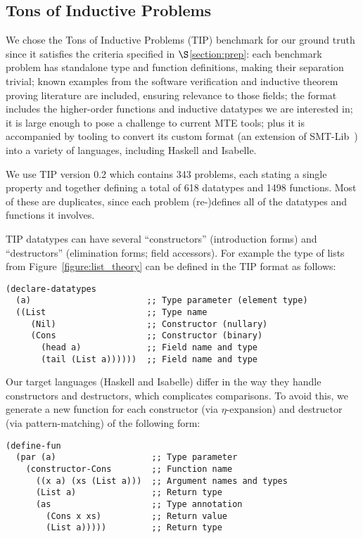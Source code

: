 \subsection{Tons of Inductive Problems}
\label{sec:tip}

We chose the Tons of Inductive Problems (TIP) benchmark for our ground truth
since it satisfies the criteria specified in $\S$\ref{section:prep}: each
benchmark problem has standalone type and function definitions, making their
separation trivial; known examples from the software verification and inductive
theorem proving literature are included, ensuring relevance to those fields; the
format includes the higher-order functions and inductive datatypes we are
interested in; it is large enough to pose a challenge to current MTE tools; plus
it is accompanied by tooling to convert its custom format (an extension of
SMT-Lib~\cite{BarFT-SMTLIB}) into a variety of languages, including Haskell and
Isabelle.

We use TIP version 0.2 which contains 343 problems, each stating a single
property and together defining a total of 618 datatypes and 1498 functions. Most
of these are duplicates, since each problem (re\nobreakdash-)defines all of the
datatypes and functions it involves.

TIP datatypes can have several ``constructors'' (introduction forms) and
``destructors'' (elimination forms; field accessors). For example the type of
lists from Figure~\ref{figure:list_theory} can be defined in the TIP format as
follows:

\begin{samepage}
\begin{verbatim}
(declare-datatypes
  (a)                       ;; Type parameter (element type)
  ((List                    ;; Type name
     (Nil)                  ;; Constructor (nullary)
     (Cons                  ;; Constructor (binary)
       (head a)             ;; Field name and type
       (tail (List a))))))  ;; Field name and type
\end{verbatim}
\end{samepage}

Our target languages (Haskell and Isabelle) differ in the way they handle
constructors and destructors, which complicates comparisons. To avoid this, we
generate a new function for each constructor (via $\eta$-expansion) and
destructor (via pattern-matching) of the following form:

\begin{samepage}
\begin{verbatim}
(define-fun
  (par (a)                   ;; Type parameter
    (constructor-Cons        ;; Function name
      ((x a) (xs (List a)))  ;; Argument names and types
      (List a)               ;; Return type
      (as                    ;; Type annotation
        (Cons x xs)          ;; Return value
        (List a)))))         ;; Return type
\end{verbatim}
\end{samepage}

